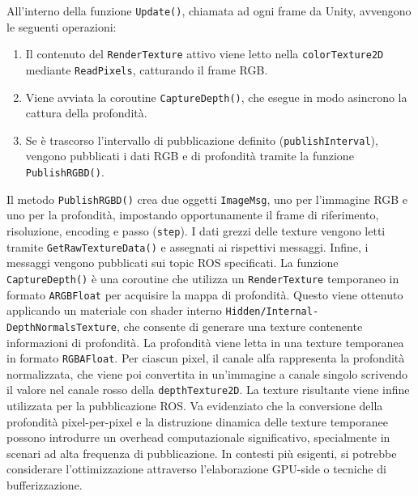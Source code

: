 \documentclass[11pt]{report}
\begin{document}
All'interno della funzione \texttt{Update()}, chiamata ad ogni frame da Unity, avvengono le seguenti operazioni:
\begin{enumerate}
  \item Il contenuto del \texttt{RenderTexture} attivo viene letto nella \texttt{colorTexture2D} mediante \texttt{ReadPixels}, catturando il frame RGB.
  \item Viene avviata la coroutine \texttt{CaptureDepth()}, che esegue in modo asincrono la cattura della profondità.
  \item Se è trascorso l'intervallo di pubblicazione definito (\texttt{publishInterval}), vengono pubblicati i dati RGB e di profondità tramite la funzione \texttt{PublishRGBD()}.
\end{enumerate}

Il metodo \texttt{PublishRGBD()} crea due oggetti \texttt{ImageMsg}, uno per l’immagine RGB e uno per la profondità, impostando opportunamente il frame di riferimento, risoluzione, encoding e passo (\texttt{step}). I dati grezzi delle texture vengono letti tramite \texttt{GetRawTextureData()} e assegnati ai rispettivi messaggi. Infine, i messaggi vengono pubblicati sui topic ROS specificati.
\newline
La funzione \texttt{CaptureDepth()} è una coroutine che utilizza un \texttt{RenderTexture} temporaneo in formato \texttt{ARGBFloat} per acquisire la mappa di profondità. Questo viene ottenuto applicando un materiale con shader interno \texttt{Hidden/Internal-DepthNormalsTexture}, che consente di generare una texture contenente informazioni di profondità.
\newline
La profondità viene letta in una texture temporanea in formato \texttt{RGBAFloat}. Per ciascun pixel, il canale alfa rappresenta la profondità normalizzata, che viene poi convertita in un'immagine a canale singolo scrivendo il valore nel canale rosso della \texttt{depthTexture2D}. La texture risultante viene infine utilizzata per la pubblicazione ROS.
\newline
Va evidenziato che la conversione della profondità pixel-per-pixel e la distruzione dinamica delle texture temporanee possono introdurre un overhead computazionale significativo, specialmente in scenari ad alta frequenza di pubblicazione. In contesti più esigenti, si potrebbe considerare l'ottimizzazione attraverso l'elaborazione GPU-side o tecniche di bufferizzazione.

\end{document}
